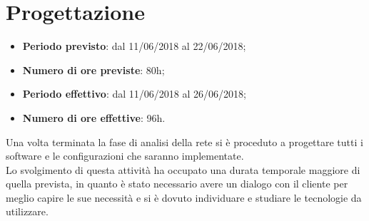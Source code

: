 \documentclass[Realizzazione.tex]{subfiles}
\begin{document}
\section{Progettazione}

\begin{itemize}
	\item \textbf{Periodo previsto}: dal 11/06/2018 al 22/06/2018;
	\item \textbf{Numero di ore previste}: 80h;
	\item \textbf{Periodo effettivo}: dal 11/06/2018 al 26/06/2018;
	\item \textbf{Numero di ore effettive}: 96h.
\end{itemize}
Una volta terminata la fase di analisi della rete si è proceduto a progettare tutti i software e le configurazioni che saranno implementate. \\
Lo svolgimento di questa attività ha occupato una durata temporale maggiore di quella prevista, in quanto è stato necessario avere un dialogo con il cliente per meglio capire le sue necessità e si è dovuto individuare e studiare le tecnologie da utilizzare.
\end{document}
